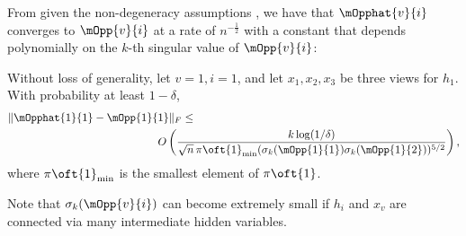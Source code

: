 
From \citet{anandkumar13tensor} given the non-degeneracy assumptions
  , we have that $\mOpphat{v}{i}$
  converges to $\mOpp{v}{i}$ at a rate of $n^{-\frac12}$ with a constant
  that depends polynomially on the $k$-th singular value of
  $\mOpp{v}{i}$:
\begin{theorem}
  \label{thm:sample-complexity}
  Without loss of generality, let $v=1, i=1$, and let $x_1, x_2, x_3$ be three views for
  $h_1$. With probability at least $1 - \delta$,
\begin{align*}
  \|\mOpphat{1}{1} - \mOpp{1}{1}\|_F 
    &\le  \\
    &
  \hspace{-0.3in}
      O\left(
      \frac{k \log(1/\delta) } 
      {\sqrt{n} \, \pi\oft{1}_{\min} (\sigma_{k}(\mOpp{1}{1}) \sigma_{k}(\mOpp{1}{2}))^{5/2}} \right),
\end{align*}
where $\pi\oft{1}_{\min}$ is the smallest element of $\pi\oft{1}$.

\end{theorem}

Note that $\sigma_{k}(\mOpp{v}{i})$ can become extremely
small if $h_i$ and $x_v$ are connected via many intermediate hidden variables.

